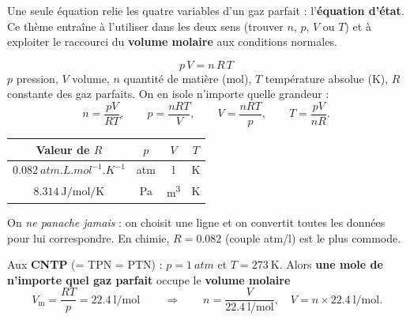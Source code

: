 \documentclass[11pt,a4paper]{article}
\begin{document}

Une seule équation relie les quatre variables d'un gaz parfait : l'\textbf{équation d'état}. Ce thème
entraîne à l'utiliser dans les deux sens (trouver $n$, $p$, $V$ ou $T$) et à exploiter le raccourci du
\textbf{volume molaire} aux conditions normales.

\begin{cle}
\[ \boxed{\,p\,V = n\,R\,T\,} \]
$p$ pression, $V$ volume, $n$ quantité de matière (\si{\mole}), $T$ température absolue (\si{\kelvin}),
$R$ constante des gaz parfaits. On en isole n'importe quelle grandeur :
\[ n=\frac{pV}{RT},\qquad p=\frac{nRT}{V},\qquad V=\frac{nRT}{p},\qquad T=\frac{pV}{nR}. \]
\end{cle}

\begin{cle}
\begin{center}\renewcommand{\arraystretch}{1.4}
\begin{tabular}{c c c c}
\toprule
\rowcolor{primary!12}
\textbf{Valeur de $R$} & \textbf{$p$} & \textbf{$V$} & \textbf{$T$}\\
\midrule
$\qty{0.082}{atm.L.mol^{-1}.K^{-1}}$ & \si{atm} & \si{\litre} & \si{\kelvin}\\
$\qty{8.314}{\joule\per\mole\per\kelvin}$ & \si{\pascal} & \si{\meter\cubed} & \si{\kelvin}\\
\bottomrule
\end{tabular}
\end{center}
On \emph{ne panache jamais} : on choisit une ligne et on convertit toutes les données pour lui
correspondre. En chimie, $R=\num{0,082}$ (couple \si{atm}/\si{\litre}) est le plus commode.
\end{cle}

\begin{cle}
Aux \textbf{CNTP} (= TPN = PTN) : $p=\qty{1}{atm}$ et $T=\qty{273}{\kelvin}$. Alors \textbf{une mole de
n'importe quel gaz parfait} occupe le \textbf{volume molaire}
\[ \boxed{\,V_{\mathrm{m}}=\frac{RT}{p}=\qty{22.4}{\litre\per\mole}\,}
   \qquad\Longrightarrow\qquad
   n=\frac{V}{\qty{22.4}{\litre\per\mole}},\quad V=n\times\qty{22.4}{\litre\per\mole}. \]
\end{cle}

\begin{center}
\end{center}
\end{document}
